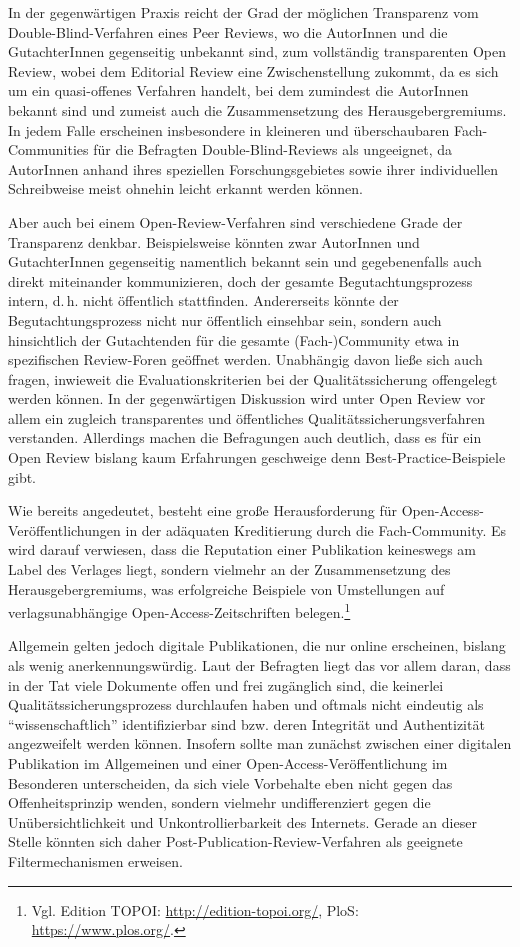 \documentclass[a4paper,
fontsize=11pt,
oneside,
numbers=noperiodatend,
parskip=half-,
bibliography=totoc,
final
]{scrartcl}
\begin{document}
In der gegenwärtigen Praxis reicht der Grad der möglichen Transparenz
vom Double-Blind-Verfahren eines Peer Reviews, wo die AutorInnen und die
GutachterInnen gegenseitig unbekannt sind, zum vollständig transparenten
Open Review, wobei dem Editorial Review eine Zwischenstellung zukommt,
da es sich um ein quasi-offenes Verfahren handelt, bei dem zumindest die
AutorInnen bekannt sind und zumeist auch die Zusammensetzung des
Herausgebergremiums. In jedem Falle erscheinen insbesondere in kleineren
und überschaubaren Fach-Communities für die Befragten
Double-Blind-Reviews als ungeeignet, da AutorInnen anhand ihres
speziellen Forschungsgebietes sowie ihrer individuellen Schreibweise
meist ohnehin leicht erkannt werden können.

Aber auch bei einem Open-Review-Verfahren sind verschiedene Grade der
Transparenz denkbar. Beispielsweise könnten zwar AutorInnen und
GutachterInnen gegenseitig namentlich bekannt sein und gegebenenfalls
auch direkt miteinander kommunizieren, doch der gesamte
Begutachtungsprozess intern, d.\,h. nicht öffentlich stattfinden.
Andererseits könnte der Begutachtungsprozess nicht nur öffentlich
einsehbar sein, sondern auch hinsichtlich der Gutachtenden für die
gesamte (Fach-)Community etwa in spezifischen Review-Foren geöffnet
werden. Unabhängig davon ließe sich auch fragen, inwieweit die
Evaluationskriterien bei der Qualitätssicherung offengelegt werden
können. In der gegenwärtigen Diskussion wird unter Open Review vor allem
ein zugleich transparentes und öffentliches Qualitätssicherungsverfahren
verstanden. Allerdings machen die Befragungen auch deutlich, dass es für
ein Open Review bislang kaum Erfahrungen geschweige denn
Best-Practice-Beispiele gibt.

Wie bereits angedeutet, besteht eine große Herausforderung für
Open-Access-Veröffentlichungen in der adäquaten Kreditierung durch die
Fach-Community. Es wird darauf verwiesen, dass die Reputation einer
Publikation keineswegs am Label des Verlages liegt, sondern vielmehr an
der Zusammensetzung des Herausgebergremiums, was erfolgreiche Beispiele
von Umstellungen auf verlagsunabhängige Open-Access-Zeitschriften
belegen.\footnote{Vgl. Edition TOPOI: \url{http://edition-topoi.org/},
  PloS: \url{https://www.plos.org/}.}

Allgemein gelten jedoch digitale Publikationen, die nur online
erscheinen, bislang als wenig anerkennungswürdig. Laut der Befragten
liegt das vor allem daran, dass in der Tat viele Dokumente offen und
frei zugänglich sind, die keinerlei Qualitätssicherungsprozess
durchlaufen haben und oftmals nicht eindeutig als
\enquote{wissenschaftlich} identifizierbar sind bzw. deren Integrität
und Authentizität angezweifelt werden können. Insofern sollte man
zunächst zwischen einer digitalen Publikation im Allgemeinen und einer
Open-Access-Veröffentlichung im Besonderen unterscheiden, da sich viele
Vorbehalte eben nicht gegen das Offenheitsprinzip wenden, sondern
vielmehr undifferenziert gegen die Unübersichtlichkeit und
Unkontrollierbarkeit des Internets. Gerade an dieser Stelle könnten sich
daher Post-Publication-Review-Verfahren als geeignete Filtermechanismen
erweisen.
\end{document}
